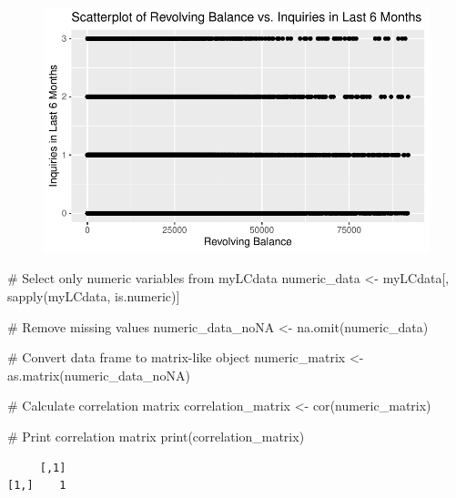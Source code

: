 \documentclass[
  letterpaper,
  DIV=11,
  numbers=noendperiod]{scrartcl}
\newenvironment{Shaded}{\begin{snugshade}}{\end{snugshade}}
\newcommand{\CommentTok}[1]{\textcolor[rgb]{0.37,0.37,0.37}{#1}}
\newcommand{\FunctionTok}[1]{\textcolor[rgb]{0.28,0.35,0.67}{#1}}
\newcommand{\NormalTok}[1]{\textcolor[rgb]{0.00,0.23,0.31}{#1}}
\newcommand{\OtherTok}[1]{\textcolor[rgb]{0.00,0.23,0.31}{#1}}
\begin{document}
\begin{figure}[H]

{\centering \includegraphics{P1-6-Haeusler_files/figure-pdf/unnamed-chunk-8-1.pdf}

}

\end{figure}

\begin{Shaded}
\begin{Highlighting}[]
\CommentTok{\# Select only numeric variables from myLCdata}
\NormalTok{numeric\_data }\OtherTok{\textless{}{-}}\NormalTok{ myLCdata[, }\FunctionTok{sapply}\NormalTok{(myLCdata, is.numeric)]}

\CommentTok{\# Remove missing values}
\NormalTok{numeric\_data\_noNA }\OtherTok{\textless{}{-}} \FunctionTok{na.omit}\NormalTok{(numeric\_data)}

\CommentTok{\# Convert data frame to matrix{-}like object}
\NormalTok{numeric\_matrix }\OtherTok{\textless{}{-}} \FunctionTok{as.matrix}\NormalTok{(numeric\_data\_noNA)}

\CommentTok{\# Calculate correlation matrix}
\NormalTok{correlation\_matrix }\OtherTok{\textless{}{-}} \FunctionTok{cor}\NormalTok{(numeric\_matrix)}

\CommentTok{\# Print correlation matrix}
\FunctionTok{print}\NormalTok{(correlation\_matrix)}
\end{Highlighting}
\end{Shaded}

\begin{verbatim}
     [,1]
[1,]    1
\end{verbatim}
\end{document}
